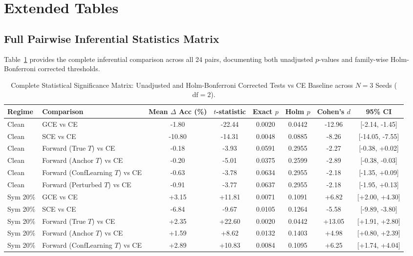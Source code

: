 \documentclass[journal]{IEEEtran}
\theoremstyle{definition}
\begin{document}
\section{Extended Tables}

\subsection{Full Pairwise Inferential Statistics Matrix}
Table~\ref{tab:app_pairwise} provides the complete inferential comparison across all 24 pairs, documenting both unadjusted $p$-values and family-wise Holm-Bonferroni corrected thresholds.

\begin{table}[t]
\centering
\caption{Complete Statistical Significance Matrix: Unadjusted and Holm-Bonferroni Corrected Tests vs CE Baseline across $N=3$ Seeds ($\text{df}=2$).}
\label{tab:app_pairwise}
\small
\setlength{\tabcolsep}{4pt}
\begin{tabular}{llcccccc}
\toprule
\textbf{Regime} & \textbf{Comparison} & \textbf{Mean $\Delta$ Acc (\%)} & \textbf{$t$-statistic} & \textbf{Exact $p$} & \textbf{Holm $p$} & \textbf{Cohen's $d$} & \textbf{95\% CI} \\
\midrule
Clean & GCE vs CE & -1.80 & -22.44 & 0.0020 & 0.0442 & -12.96 & [-2.14, -1.45] \\
Clean & SCE vs CE & -10.80 & -14.31 & 0.0048 & 0.0885 & -8.26 & [-14.05, -7.55] \\
Clean & Forward (True $T$) vs CE & -0.18 & -3.93 & 0.0591 & 0.2955 & -2.27 & [-0.38, +0.02] \\
Clean & Forward (Anchor $T$) vs CE & -0.20 & -5.01 & 0.0375 & 0.2599 & -2.89 & [-0.38, -0.03] \\
Clean & Forward (ConfLearning $T$) vs CE & -0.63 & -3.78 & 0.0634 & 0.2955 & -2.18 & [-1.35, +0.09] \\
Clean & Forward (Perturbed $T$) vs CE & -0.91 & -3.77 & 0.0637 & 0.2955 & -2.18 & [-1.95, +0.13] \\
\midrule
Sym 20\% & GCE vs CE & +3.15 & +11.81 & 0.0071 & 0.1091 & +6.82 & [+2.00, +4.30] \\
Sym 20\% & SCE vs CE & -6.84 & -9.67 & 0.0105 & 0.1264 & -5.58 & [-9.89, -3.80] \\
Sym 20\% & Forward (True $T$) vs CE & +2.35 & +22.60 & 0.0020 & 0.0442 & +13.05 & [+1.91, +2.80] \\
Sym 20\% & Forward (Anchor $T$) vs CE & +1.59 & +8.62 & 0.0132 & 0.1403 & +4.98 & [+0.80, +2.39] \\
Sym 20\% & Forward (ConfLearning $T$) vs CE & +2.89 & +10.83 & 0.0084 & 0.1095 & +6.25 & [+1.74, +4.04] \\

\end{tabular}
\end{table}
\end{document}

